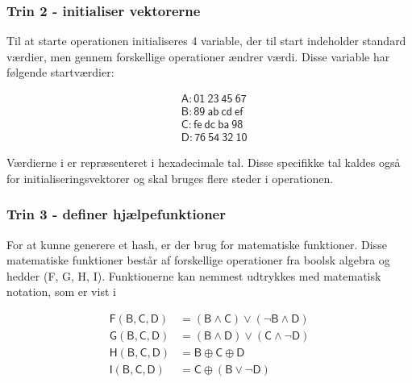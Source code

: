 \documentclass[12pt]{article}
\begin{document}
\subsubsection{Trin 2 - initialiser vektorerne}
Til at starte operationen initialiseres 4 variable, der til start indeholder standard værdier, men gennem forskellige operationer ændrer værdi. Disse variable har følgende startværdier:

\begin{equation}
\begin{split}
&\mathsf{A: 01\ 23\ 45\ 67}\\
&\mathsf{B: 89\ ab\ cd\ ef}\\
&\mathsf{C: fe\ dc\ ba\ 98}\\
&\mathsf{D: 76\ 54\ 32\ 10}
\end{split}
\label{step-2-word-buffers}
\end{equation}

Værdierne i \equationautorefname{~\ref{step-2-word-buffers}} er repræsenteret i hexadecimale tal. Disse specifikke tal kaldes også for initialiseringsvektorer og skal bruges flere steder i operationen. 

\subsubsection{Trin 3 - definer hjælpefunktioner}
For at kunne generere et hash, er der brug for matematiske funktioner. Disse matematiske funktioner består af forskellige operationer fra boolsk algebra og hedder (F, G, H, I). 
Funktionerne kan nemmest udtrykkes med matematisk notation, som er vist i \equationautorefname{~\ref{step-3-aux-func}}

\begin{equation}\label{step-3-aux-func}
\begin{split}
\mathsf{F(B, C, D)} & = \mathsf{(B\wedge C)\vee(\neg B\wedge D)}    \\
\mathsf{G(B, C, D)} & = \mathsf{(B\wedge D)\vee(C\wedge \neg D)}    \\
\mathsf{H(B, C, D)} & = \mathsf{B \oplus C \oplus D}                \\
\mathsf{I(B, C, D)} & = \mathsf{C \oplus (B \vee \neg D)}
\end{split}
\end{equation}
\end{document}
